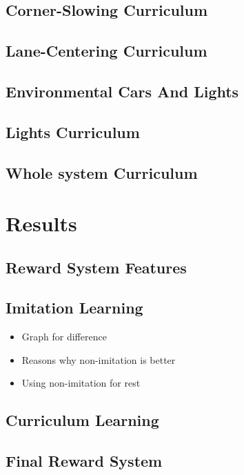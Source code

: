 \documentclass{article}
\begin{document}
\subsection{Corner-Slowing Curriculum}
\lipsum[2][1]

\subsection{Lane-Centering Curriculum}
\lipsum[2][1]

\subsection{Environmental Cars And Lights}
\lipsum[2][1]

\subsection{Lights Curriculum}
\lipsum[2][1]

\subsection{Whole system Curriculum}
\lipsum[2][1]

\section{Results}
\lipsum[2][1]

\subsection{Reward System Features}
\lipsum[2][1]

\subsection{Imitation Learning}
\begin{itemize}
    \item Graph for difference
    \item Reasons why non-imitation is better
    \item Using non-imitation for rest
\end{itemize}

\subsection{Curriculum Learning}
\lipsum[2][1]

\subsection{Final Reward System}
\lipsum[2][1]
\end{document}
